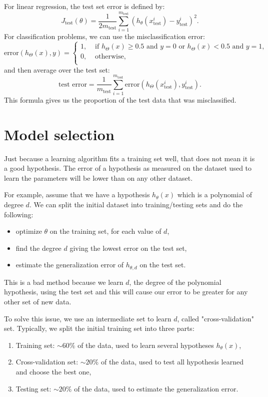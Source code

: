 \documentclass[a4paper,11pt]{report}
\begin{document}
For linear regression, the test set error is defined by: $$J_{\mathrm{test}}(\theta) = \dfrac{1}{2m_{\mathrm{test}}}\sum_{i=1}^{m_{\mathrm{test}}}{(h_\theta(x^i_{\mathrm{test}})−y^i_{\mathrm{test}})^2}.$$
For classification problems, we can use the misclassification error:
$$\mathrm{error}(h_\Theta(x),y) =
\left\{\begin{matrix}
1, & \text{ if }  h_\Theta(x) \geq 0.5 \text{ and } y = 0 \text { or } h_\Theta(x) < 0.5  \text{ and } y = 1, \\
0, & \text{ otherwise,}\\
\end{matrix}\right.$$
and then average over the test set:
$$ \text{test error} = \dfrac{1}{m_{\mathrm{test}}} \sum^{m_{\mathrm{test}}}_{i=1} \mathrm{error}(h_\Theta(x^{i}_{\mathrm{test}}), y^{i}_{\mathrm{test}}).$$
This formula gives us the proportion of the test data that was misclassified.

\section{Model selection}

Just because a learning algorithm fits a training set well, that does not mean it is a good hypothesis. The error of a hypothesis as measured on the dataset used to learn the parameters will be lower than on any other dataset.

For example, assume that we have a hypothesis $h_\theta(x)$ which is a polynomial of degree $d$. We can split the initial dataset into training/testing sets and do the following:
\begin{itemize}
  \item optimize $\theta$ on the training set, for each value of $d$,
  \item find the degree $d$ giving the lowest error on the test set,
  \item estimate the generalization error of $h_{\theta, d}$ on the test set.
\end{itemize}
This is a bad method because we learn $d$, the degree of the polynomial hypothesis, using the test set and this will cause our error to be greater for any other set of new data.

To solve this issue, we use an intermediate set to learn $d$, called "cross-validation" set. Typically, we split the initial training set into three parts:
\begin{enumerate}
  \item Training set: $\sim 60\%$ of the data, used to learn several hypotheses $h_\theta(x)$,
  \item Cross-validation set: $\sim 20\%$ of the data, used to test all hypothesis learned and choose the best one,
  \item Testing set: $\sim 20\%$ of the data, used to estimate the generalization error.
\end{enumerate}
\end{document}
